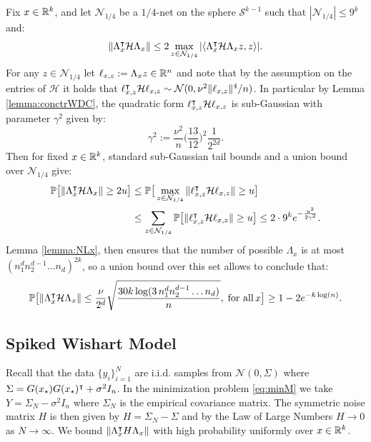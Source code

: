 \noindent Fix $x \in \mathbb{R}^{k}$, 
and let $\mathcal{N}_{{1}/{4}}$ be a $1/4$-net on the sphere $\mathcal{S}^{k-1}$ such that $|\mathcal{N}_{1/4}| \leq 9^k$ and:
\[
\|\Lambda_x^\intercal \mathcal{H} \Lambda_x \| \leq 2 \max_{z \in \mathcal{N}_{{1}/{4}}} |\langle \Lambda_x^\intercal \mathcal{H} \Lambda_x z,   z\rangle|.
\]
For any  $z \in\mathcal{N}_{{1}/{4}}$ let $\ell_{x,z} := \Lambda_x z \in \mathbb{R}^n$ and note that by the assumption on the  entries of $\mathcal{H}$ it holds that
$\ell_{x,z}^\intercal \mathcal{H} \ell_{x,z} \sim  \mathcal{N}(0,  {\nu^2 \|\ell_{x,z}\|^4}/{n})$.
In particular by Lemma \ref{lemma:conctrWDC}, the quadratic form $\ell_{x,z}^\intercal \mathcal{H} \ell_{x,z}$ is sub-Gaussian with parameter $\gamma^2$ given by: 
\[{\gamma}^2 := \frac{\nu^2}{n} \Big(\frac{13}{12}\Big)^2 \frac{1}{2^{2d}}.\]
Then for fixed $x \in \mathbb{R}^k$, standard sub-Gaussian tail bounds and a union bound over $\mathcal{N}_{{1}/{4}}$ give:
\[
\begin{aligned}
\mathbb{P}\big[ \| \Lambda_x^\intercal \mathcal{H}  \Lambda_x \| \geq 2 u \big]
&\leq \mathbb{P}\big[ \max_{z \in \mathcal{N}_{1/4}} \| \ell_{x,z}^\intercal \mathcal{H} \ell_{x,z}\| \geq u \big] \\
&\leq \sum_{z \in \mathcal{N}_{1/4}} \mathbb{P}\big[  \| \ell_{x,z}^\intercal \mathcal{H}  \ell_{x,z}\| \geq u \big]
\leq 2 \cdot 9^{k} e^{-\frac{u^2}{2 {\gamma}^2}}.
\end{aligned}
\]
Lemma \ref{lemma:NLx}, then ensures that the number of possible $\Lambda_x$ is at most $(n_1^d n_2^{d-1} \dots n_d)^{2 k}$, so a union bound over this set allows to conclude that:
\[
\mathbb{P}\big[ \| \Lambda_x^\intercal \mathcal{H}  \Lambda_x \| \leq  \frac{\nu}{2^d} \sqrt{  \frac{30 k \log (3\, n_1^d n_2^{d-1} \dots n_d)}{n}}, \; \text{for all}\, x \big] 		
\geq 1 - 2 e^{- k \log (n)}.
\]

\subsection{Spiked Wishart Model}

Recall that the data $\{y_i \}_{i=1}^N$ are i.i.d. samples from $\mathcal{N}(0, \Sigma)$ where $\Sigma = G({x_{\star}})G({x_{\star}})^\intercal + \sigma^2 I_n$.
In the minimization problem \eqref{eq:minM} we take $Y = \Sigma_N - \sigma^2 I_n$ where $\Sigma_N$ is the empirical covariance matrix. The symmetric noise matrix $H$ is then given by $H = \Sigma_N - \Sigma$ and by the Law of Large Numbers $H \to 0$ as $N \to \infty$.
We bound $\|\Lambda_x^\intercal H \Lambda_x \|$ with high probability uniformly over $x \in \mathbb{R}^k$.

